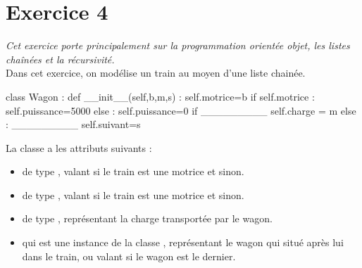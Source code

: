 \documentclass[11pt,a4paper,french,twoside]{PMCours}
\begin{document}
\newpage\noindent

\section*{Exercice 4}
\emph{Cet exercice porte principalement sur la programmation orientée objet, les listes chaînées et la récursivité.}\medskip\\
Dans cet exercice, on modélise un train au moyen d'une liste chainée. 
\begin{Python}
class Wagon : 
	def __init__(self,b,m,s) : 
		self.motrice=b
		if self.motrice :
			self.puissance=5000
		else : 
			self.puissance=0
		if  _________
			self.charge = m
		else :
		    _________
		self.suivant=s
\end{Python}
La classe  a les attributs suivants : 
\begin{itemize}
\item {} de type , valant  si le train est une motrice et  sinon.
\item {} de type , valant  si le train est une motrice et  sinon.
\item {} de type , représentant la charge transportée par le wagon.
\item {} qui est une instance de la classe , représentant le wagon qui situé après lui dans le train, ou valant  si le wagon est le dernier. 
\end{itemize}
\end{document}
